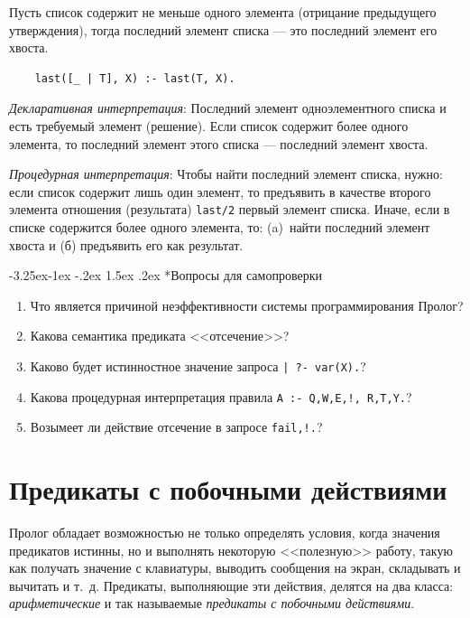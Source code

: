 \documentclass[12pt, openany, twoside]{book} %
\makeatletter
\renewcommand\subsubsection{\@startsection{subsubsection}{3}{\z@}%
                                     {-3.25ex\@plus -1ex \@minus -.2ex}%
                                     {1.5ex \@plus .2ex}%
                                     {\normalfont\normalsize\bfseries}}
\newenvironment{questions}{\subsubsection*{Вопросы для самопроверки}\begin{enumerate}}{\end{enumerate}}
\makeatother
\begin{document}
Пусть список содержит не меньше одного элемента (отрицание предыдущего утверждения), тогда последний элемент списка --- это последний элемент его хвоста.

{\tt\begin{verbatim}
    last([_ | T], X) :- last(T, X).
\end{verbatim}}
\emph{Декларативная интерпретация}: Последний элемент одноэлементного списка и есть требуемый элемент (решение). Если список содержит более одного элемента, то последний элемент этого списка --- последний элемент хвоста.

\emph{Процедурная интерпретация}: Чтобы найти последний элемент списка, нужно: если список содержит лишь один элемент, то предъявить в качестве второго элемента отношения (результата) {\tt last/2} первый элемент списка. Иначе, если в списке содержится более одного элемента, то: (a)~найти последний элемент хвоста и (б) предъявить его как результат.

\begin{questions}
\item{} Что является причиной неэффективности системы программирования Пролог?
\item{} Какова семантика предиката <<отсечение>>?
\item{} Каково будет истинностное значение запроса \texttt{| ?- var(X).}?
\item{} Какова процедурная интерпретация правила \texttt{A :- Q,W,E,!, R,T,Y.}?
\item{} Возымеет ли действие отсечение в запросе \texttt{fail,!.}?
\end{questions}

\chapter{Предикаты с побочными действиями}
Пролог обладает возможностью не только определять условия, когда значения предикатов истинны, но и выполнять некоторую <<полезную>> работу, такую как получать значение с клавиатуры, выводить сообщения на экран, складывать и вычитать и т.~д. Предикаты, выполняющие эти действия, делятся на два класса: {\em арифметические} и так называемые {\em предикаты с побочными действиями}.
\end{document}
